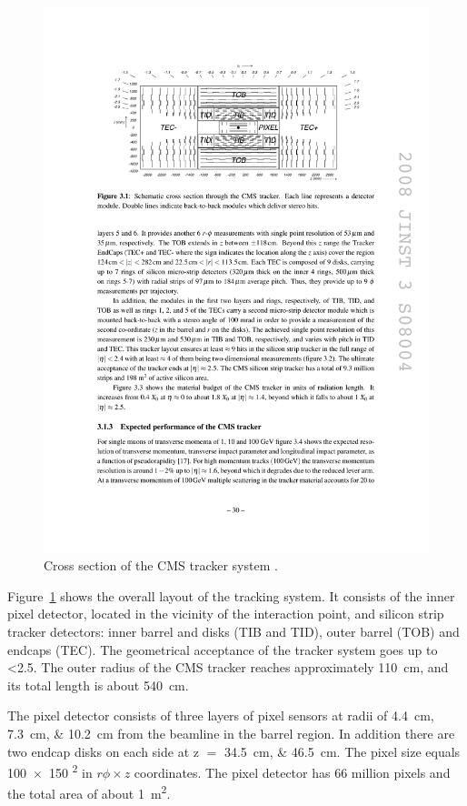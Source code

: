 \begin{figure}[htbp]
  \centering
  \leavevmode
  \includegraphics[width=\columnwidth]{tracker}
  \caption{Cross section of the CMS tracker system \autocite{CMS}.}
  \label{fig:tracker}
\end{figure}

Figure~\ref{fig:tracker} shows the overall layout of the tracking system. It consists of the inner pixel detector,
located in the vicinity of the interaction point, and silicon strip tracker detectors: inner barrel and disks (TIB and
TID), outer barrel (TOB) and endcaps (TEC). The geometrical acceptance of the tracker system goes up to \abs\eta
\num{<2.5}. The outer radius of the CMS tracker reaches approximately \SI{110}{\cm}, and its total length is about
\SI{540}{\cm}.

The pixel detector consists of three layers of pixel sensors at radii of \SIlist{4.4;7.3;10.2}{\cm} from the beamline in
the barrel region. In addition there are two endcap disks on each side at \abs z $=$ \SIlist{34.5;46.5}{\cm}. The pixel
size equals \num{100x150} \si{\micron\squared} in $r \phi \times z$ coordinates. The pixel detector has 66 million
pixels and the total area of about \SI{1}{\m\squared}.

